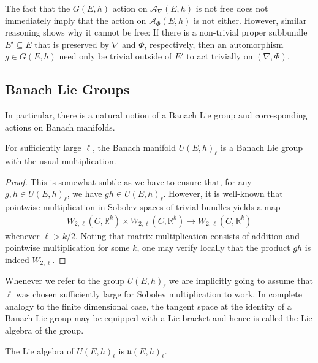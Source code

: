 \documentclass[12pt]{ociamthesis}  %
\begin{document}
\begin{example}\label{ex:not_free_double}
  The fact that the $G(E,h)$ action on $\mathcal A_\nabla(E,h)$ is not free does not
  immediately imply that the action on $\mathcal A_\Phi(E,h)$ is not either. However,
  similar reasoning shows why it cannot be free: If there is a non-trivial
  proper subbundle $E'\subseteq E$ that is preserved by $\nabla$ and $\Phi$,
  respectively, then an automorphism $g\in G(E,h)$ need only be trivial
  outside of $E'$ to act trivially on $(\nabla,\Phi)$.
\end{example}


\subsection{Banach Lie Groups}

In particular, there is a natural notion of a Banach Lie group and
corresponding actions on Banach manifolds.

\begin{example}\label{ex:unitary_banach_lie_group}
  For sufficiently large $\ell$, the Banach manifold $U(E,h)_\ell$ is a
  Banach Lie group with the usual multiplication.
  \begin{proof}
    This is somewhat subtle as we have to ensure that, for any
    $g,h\in U(E,h)_\ell$, we have $gh\in U(E,h)_\ell$. However, it
    is well-known that pointwise multiplication
    in Sobolev spaces of trivial bundles yields a map
    \begin{align*}
      W_{2,\ell}(C,\mathbb R^k) \times
      W_{2,\ell}(C,\mathbb R^k) \to
      W_{2,\ell}(C,\mathbb R^k)
    \end{align*}
    whenever $\ell > k/2$. \cite[Theorem 6.1]{behzadan2021}
    Noting that matrix multiplication consists of addition and
    pointwise multiplication for some $k$, one may verify locally that the
    product $gh$ is indeed $W_{2,\ell}$.
  \end{proof}
\end{example}

Whenever we refer to the group $U(E,h)_\ell$ we are implicitly going to
assume that $\ell$ was chosen sufficiently large for Sobolev multiplication
to work.
In complete analogy to the finite dimensional case, the tangent space
at the identity of a Banach Lie group may be equipped with a Lie bracket
and hence is called the Lie algebra of the group.

\begin{example}
  The Lie algebra of $U(E,h)_\ell$ is $\mathfrak u(E,h)_\ell$.
\end{example}
\end{document}
